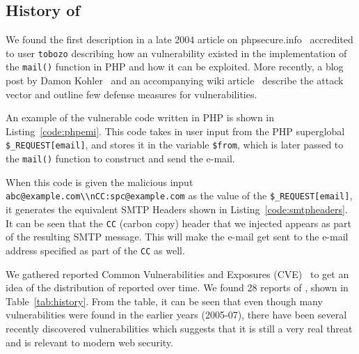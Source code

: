 \subsection{History of \ehi}

We found the first \ehi description in a late 2004 article on phpsecure.info~\cite{Tobozo} accredited to user \lstinline|tobozo| describing how an \ehi vulnerability existed in the implementation of the \texttt{mail()} function in PHP and how it can be exploited. More recently, a blog post by Damon Kohler~\cite{DK} and an accompanying wiki article~\cite{Injection} describe the attack vector and outline few defense measures for \ehi vulnerabilities.


An example of the vulnerable code written in PHP is shown in Listing~\ref{code:phpemi}. This code takes in user input from the PHP superglobal \texttt{\$\_REQUEST[\textquotesingle email\textquotesingle]}, and stores it in the variable \texttt{\$from}, which is later passed to the \texttt{mail()} function to construct and send the e-mail.



\begin{sloppypar}
When this code is given the malicious input \texttt{\lstinline{abc@example.com\\nCC:spc@example.com}} as the value of the \texttt{\$\_REQUEST[\textquotesingle email\textquotesingle]}, it generates the equivalent SMTP Headers shown in Listing~\ref{code:smtpheaders}. It can be seen that the \texttt{CC} (carbon copy) header that we injected appears as part of the resulting SMTP message. This will make the e-mail get sent to the e-mail address specified as part of the \texttt{CC} as well. 

%
\end{sloppypar}

We gathered reported Common Vulnerabilities and Exposures
(CVE)~\cite{cve} to get an idea of the distribution of
reported \ehi over time. We found 28 reports of \ehi, shown in
Table~\ref*{tab:history}. From the table, it can be seen that even though many \ehi vulnerabilities were found in the earlier years (2005-07), there have been several recently discovered \ehi vulnerabilities which suggests that it is still a very real threat and is relevant to modern web security.


